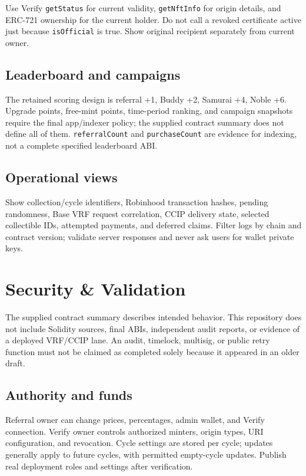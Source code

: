 \documentclass[
  10pt,
  letterpaper,
]{article}
\begin{document}
Use Verify \texttt{getStatus} for current validity, \texttt{getNftInfo}
for origin details, and ERC-721 ownership for the current holder. Do not
call a revoked certificate active just because \texttt{isOfficial} is
true. Show original recipient separately from current owner.

\subsection{Leaderboard and campaigns}\label{leaderboard-and-campaigns}

The retained scoring design is referral +1, Buddy +2, Samurai +4, Noble
+6. Upgrade points, free-mint points, time-period ranking, and campaign
snapshots require the final app/indexer policy; the supplied contract
summary does not define all of them. \texttt{referralCount} and
\texttt{purchaseCount} are evidence for indexing, not a complete
specified leaderboard ABI.

\subsection{Operational views}\label{operational-views}

Show collection/cycle identifiers, Robinhood transaction hashes, pending
randomness, Base VRF request correlation, CCIP delivery state, selected
collectible IDs, attempted payments, and deferred claims. Filter logs by
chain and contract version; validate server responses and never ask
users for wallet private keys.

\section{Security \& Validation}\label{security-validation}

The supplied contract summary describes intended behavior. This
repository does not include Solidity sources, final ABIs, independent
audit reports, or evidence of a deployed VRF/CCIP lane. An audit,
timelock, multisig, or public retry function must not be claimed as
completed solely because it appeared in an older draft.

\subsection{Authority and funds}\label{authority-and-funds}

Referral owner can change prices, percentages, admin wallet, and Verify
connection. Verify owner controls authorized minters, origin types, URI
configuration, and revocation. Cycle settings are stored per cycle;
updates generally apply to future cycles, with permitted empty-cycle
updates. Publish real deployment roles and settings after verification.
\end{document}
